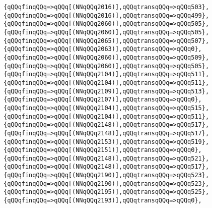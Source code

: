 \verb|{qQQqfinqQQq=>qQQq[(NNqQQq2016)],qQQqtransqQQq=>qQQq503},|\newline
\verb|{qQQqfinqQQq=>qQQq[(NNqQQq2016)],qQQqtransqQQq=>qQQq499},|\newline
\verb|{qQQqfinqQQq=>qQQq[(NNqQQq2060)],qQQqtransqQQq=>qQQq505},|\newline
\verb|{qQQqfinqQQq=>qQQq[(NNqQQq2060)],qQQqtransqQQq=>qQQq505},|\newline
\verb|{qQQqfinqQQq=>qQQq[(NNqQQq2065)],qQQqtransqQQq=>qQQq507},|\newline
\verb|{qQQqfinqQQq=>qQQq[(NNqQQq2063)],qQQqtransqQQq=>qQQq0},|\newline
\verb|{qQQqfinqQQq=>qQQq[(NNqQQq2060)],qQQqtransqQQq=>qQQq509},|\newline
\verb|{qQQqfinqQQq=>qQQq[(NNqQQq2060)],qQQqtransqQQq=>qQQq505},|\newline
\verb|{qQQqfinqQQq=>qQQq[(NNqQQq2104)],qQQqtransqQQq=>qQQq511},|\newline
\verb|{qQQqfinqQQq=>qQQq[(NNqQQq2104)],qQQqtransqQQq=>qQQq511},|\newline
\verb|{qQQqfinqQQq=>qQQq[(NNqQQq2109)],qQQqtransqQQq=>qQQq513},|\newline
\verb|{qQQqfinqQQq=>qQQq[(NNqQQq2107)],qQQqtransqQQq=>qQQq0},|\newline
\verb|{qQQqfinqQQq=>qQQq[(NNqQQq2104)],qQQqtransqQQq=>qQQq515},|\newline
\verb|{qQQqfinqQQq=>qQQq[(NNqQQq2104)],qQQqtransqQQq=>qQQq511},|\newline
\verb|{qQQqfinqQQq=>qQQq[(NNqQQq2148)],qQQqtransqQQq=>qQQq517},|\newline
\verb|{qQQqfinqQQq=>qQQq[(NNqQQq2148)],qQQqtransqQQq=>qQQq517},|\newline
\verb|{qQQqfinqQQq=>qQQq[(NNqQQq2153)],qQQqtransqQQq=>qQQq519},|\newline
\verb|{qQQqfinqQQq=>qQQq[(NNqQQq2151)],qQQqtransqQQq=>qQQq0},|\newline
\verb|{qQQqfinqQQq=>qQQq[(NNqQQq2148)],qQQqtransqQQq=>qQQq521},|\newline
\verb|{qQQqfinqQQq=>qQQq[(NNqQQq2148)],qQQqtransqQQq=>qQQq517},|\newline
\verb|{qQQqfinqQQq=>qQQq[(NNqQQq2190)],qQQqtransqQQq=>qQQq523},|\newline
\verb|{qQQqfinqQQq=>qQQq[(NNqQQq2190)],qQQqtransqQQq=>qQQq523},|\newline
\verb|{qQQqfinqQQq=>qQQq[(NNqQQq2195)],qQQqtransqQQq=>qQQq525},|\newline
\verb|{qQQqfinqQQq=>qQQq[(NNqQQq2193)],qQQqtransqQQq=>qQQq0},|\newline
